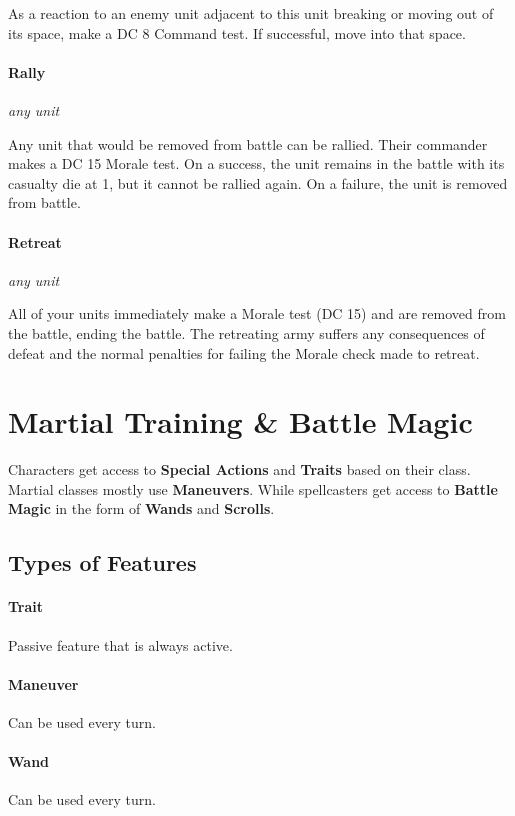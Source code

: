 \documentclass[letterpaper,twocolumn,openany,nodeprecatedcode]{dndbook}
\begin{document}
As a reaction to an enemy unit adjacent to this unit breaking or moving out of its space, make a DC 8 Command test.
If successful, move into that space.

\paragraph{Rally}
\textit{any unit}

Any unit that would be removed from battle can be rallied.
Their commander makes a DC 15 Morale test.
On a success, the unit remains in the battle with its casualty die at 1, but it cannot be rallied again.
On a failure, the unit is removed from battle.

\paragraph{Retreat}
\textit{any unit}


All of your units immediately make a Morale test (DC 15) and are removed from the battle, ending the battle.
The retreating army suffers any consequences of defeat and the normal penalties for failing the Morale check made to retreat.

\section{Martial Training \& Battle Magic}

Characters get access to \textbf{Special Actions} and \textbf{Traits} based on their class.
Martial classes mostly use \textbf{Maneuvers}.
While spellcasters get access to \textbf{Battle Magic} in the form of \textbf{Wands} and \textbf{Scrolls}.

\subsection{Types of Features}

\paragraph{Trait} Passive feature that is always active.
\paragraph{Maneuver} Can be used every turn.
\paragraph{Wand} Can be used every turn.
\end{document}
